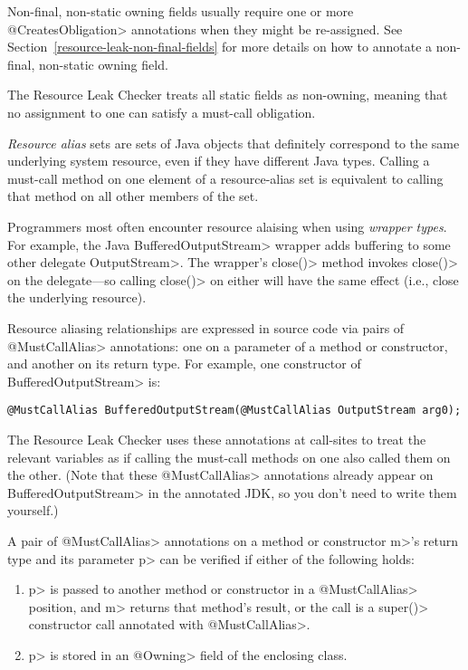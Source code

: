 Non-final, non-static owning fields usually require one or more \<@CreatesObligation> annotations
when they might be re-assigned. See Section~\ref{resource-leak-non-final-fields} for
more details on how to annotate a non-final, non-static owning field.

The Resource Leak Checker treats all static fields as non-owning, meaning that no assignment to one
can satisfy a must-call obligation.



\emph{Resource alias} sets are sets of Java objects that
definitely correspond to the same underlying system resource,
even if they have different Java types.
Calling a must-call method on one element of a resource-alias set
is equivalent to calling that method on all other members of the set.

Programmers most often encounter resource alaising when using \emph{wrapper types}.
For example, the Java \<BufferedOutputStream> wrapper adds buffering to some other delegate \<OutputStream>.
The wrapper's \<close()> method invokes \<close()> on the delegate---so calling \<close()> on either
will have the same effect (i.e., close the underlying resource).

Resource aliasing relationships are expressed in source code via pairs of \<@MustCallAlias> annotations:
one on a parameter of a method or constructor, and another on its return type.
For example, one constructor of \<BufferedOutputStream> is:
\begin{verbatim}
@MustCallAlias BufferedOutputStream(@MustCallAlias OutputStream arg0);
\end{verbatim}
The Resource Leak Checker uses these annotations at call-sites to treat the relevant variables as if
calling the must-call methods on one also called them on the other.
(Note that these \<@MustCallAlias> annotations already appear on
\<BufferedOutputStream> in the annotated JDK, so you don't need to write
them yourself.)

A pair of \<@MustCallAlias> annotations on a method or constructor \<m>'s return type
and its parameter \<p> can be verified if either of the following holds:
\begin{enumerate}
\item \<p> is passed to another method or constructor in a
  \<@MustCallAlias> position, and \<m> returns that method's result,
  or the call is a \<super()> constructor call annotated
  with \<@MustCallAlias>.
\item \<p> is stored in an \<@Owning> field of the enclosing class.
\end{enumerate}

